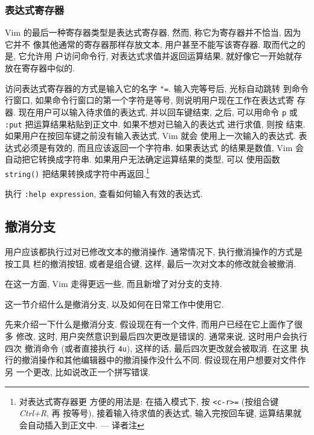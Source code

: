 \subsubsection{表达式寄存器}
\label{subsubsec:the_expression_register}

Vim 的最后一种寄存器类型是表达式寄存器, 然而, 称它为寄存器并不恰当, 因为它并不
像其他通常的寄存器那样存放文本, 用户甚至不能写该寄存器. 取而代之的是, 它允许用
户访问命令行, 对表达式求值并返回运算结果, 就好像它一开始就存放在寄存器中似的.

访问表达式寄存器的方式是输入它的名字 \texttt{"=}. 输入完等号后, 光标自动跳转
到命令行窗口, 如果命令行窗口的第一个字符是等号, 则说明用户现在工作在表达式寄
存器. 现在用户可以输入待求值的表达式, 并以回车键结束, 之后, 可以用命令
\texttt{p} 或 \texttt{:put} 把运算结果粘贴到正文中. 如果不想对已输入的表达式
进行求值, 则按  结束. 如果用户在按回车键之前没有输入表达式, Vim 就会
使用上一次输入的表达式. 表达式必须是有效的, 而且应该返回一个字符串. 如果表达式
的结果是数值, Vim 会自动把它转换成字符串. 如果用户无法确定运算结果的类型, 可以
使用函数 \texttt{string()} 把结果转换成字符中再返回.\footnote{对表达式寄存器更
方便的用法是: 在插入模式下, 按 \texttt{<c-r>=} (按组合键 \textit{Ctrl+R}, 再
按等号), 接着输入待求值的表达式, 输入完按回车键, 运算结果就会自动插入到正文中.
--- 译者注}

\begin{warning}
    执行 \texttt{:help expression}, 查看如何输入有效的表达式.
\end{warning}

\subsection{撤消分支}
\label{subsec:using_undo_branching}

用户应该都执行过对已修改文本的撤消操作. 通常情况下, 执行撤消操作的方式是按工具
栏的撤消按钮, 或者是组合键, 这样, 最后一次对文本的修改就会被撤消.

在这一方面, Vim 走得更远一些, 而且新增了对分支的支持.

这一节介绍什么是撤消分支, 以及如何在日常工作中使用它.

先来介绍一下什么是撤消分支. 假设现在有一个文件, 而用户已经在它上面作了很多
修改, 这时, 用户突然意识到最后四次更改是错误的. 通常来说, 这时用户会执行四次
撤消命令 (或者直接执行 \texttt{4u}), 这样的话, 最后四次更改就会被取消. 在这里
执行的撤消操作和其他编辑器中的撤消操作没什么不同. 假设现在用户想要对文件作另
一个更改, 比如说改正一个拼写错误.

